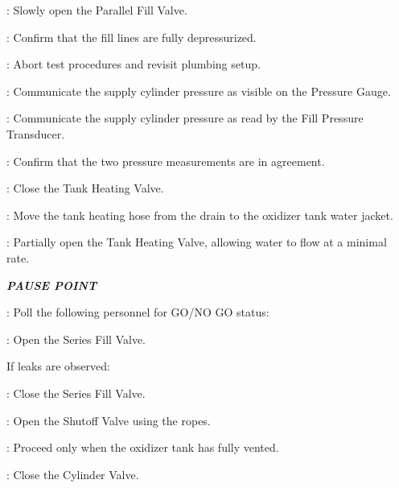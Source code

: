 \begin{checklist}
\begin{checklist}[label=$\bullet$]
\begin{checklist}
            \item \primary{}: Slowly open the Parallel Fill Valve.
            \item \daq{}: Confirm that the fill lines are fully depressurized.
            \item \ops{}: Abort test procedures and revisit plumbing setup.
        \end{checklist}
    \end{checklist}
    \item \primary{}: Communicate the supply cylinder pressure as visible on the Pressure Gauge.
    \item \daq{}: Communicate the supply cylinder pressure as read by the Fill Pressure Transducer.
    \item \daq{}: Confirm that the two pressure measurements are in agreement.
    \item \heat: Close the Tank Heating Valve.
    \item \primary: Move the tank heating hose from the drain to the oxidizer tank water jacket.
    \item \heat: Partially open the Tank Heating Valve, allowing water to flow at a minimal rate.
    \item \textbf{\textit{PAUSE POINT}}
    \item \ops{}: Poll the following personnel for GO/NO GO status:
    \begin{checklist}
        \item \peri{}
        \item \perii{}
        \item \heat
        \item \daq{}
        \item \primary{}
        \item \secondary
    \end{checklist}
    \item \primary{}: Open the Series Fill Valve.
    \begin{checklist}[label=$\bullet$]
        \item If leaks are observed:
        \begin{checklist}
            \item \primary{}: Close the Series Fill Valve.
            \item \primary{}: Open the Shutoff Valve using the ropes.
            \item \secondary: Proceed only when the oxidizer tank has fully vented.
            \item \primary{}: Close the Cylinder Valve.

\end{checklist}
\end{checklist}
\end{checklist}
